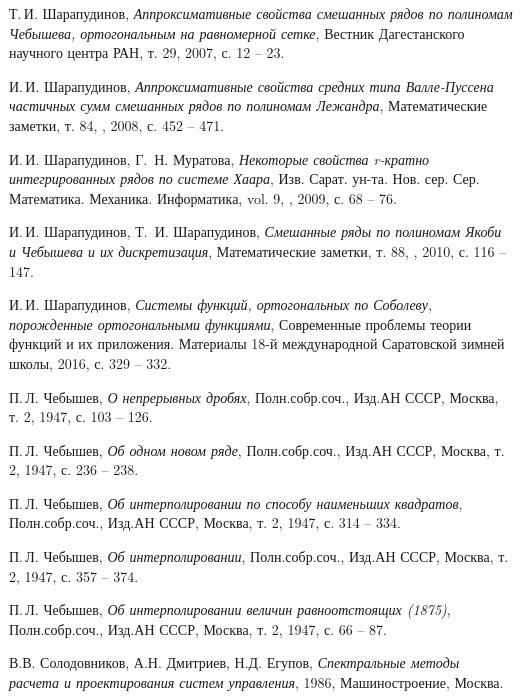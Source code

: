 Т.\,И. Шарапудинов,
\textit{Аппроксимативные свойства смешанных рядов по полиномам Чебышева, ортогональным на равномерной сетке},
Вестник Дагестанского научного центра РАН, т. 29, 2007, с. 12 -- 23.


И.\,И. Шарапудинов,
\textit{Аппроксимативные свойства средних типа Валле-Пуссена частичных сумм смешанных рядов по полиномам Лежандра},
Математические заметки, т. 84, , 2008, с. 452 -- 471.

 И.\,И. Шарапудинов,  Г.\, Н. Муратова,
\textit{Некоторые свойства r-кратно интегрированных рядов по системе Хаара},
Изв. Сарат. ун-та. Нов. сер. Сер. Математика. Механика. Информатика, vol. 9, , 2009, с. 68 -- 76.

И.\,И. Шарапудинов, Т.\, И. Шарапудинов,
\textit{Смешанные ряды по полиномам Якоби и Чебышева и их дискретизация},
Математические заметки, т. 88, , 2010, с. 116 -- 147.


И.\,И. Шарапудинов,
\textit{Системы функций, ортогональных по Соболеву, порожденные ортогональными функциями},
Современные проблемы теории функций и их приложения.  Материалы 18-й международной Саратовской зимней школы,
2016, с. 329 -- 332.

П.\,Л. Чебышев,
\textit{О непрерывных дробях}, Полн.собр.соч., Изд.АН СССР, Москва, т. 2, 1947, с. 103 -- 126.

П.\,Л. Чебышев,
\textit{Об одном новом ряде}, Полн.собр.соч., Изд.АН СССР, Москва, т. 2, 1947, с. 236 -- 238.

П.\,Л. Чебышев,
\textit{Об интерполировании по способу наименьших квадратов},
Полн.собр.соч., Изд.АН СССР, Москва, т. 2, 1947, с. 314 -- 334.

П.\,Л. Чебышев,
\textit{Об интерполировании}, Полн.собр.соч., Изд.АН СССР, Москва, т. 2, 1947, с. 357 -- 374.

П.\,Л. Чебышев,
\textit{Об интерполировании величин  равноотстоящих (1875)},
Полн.собр.соч., Изд.АН СССР, Москва, т. 2, 1947, с. 66 -- 87.

В.В. Солодовников, А.Н. Дмитриев, Н.Д. Егупов,
\textit{Спектральные методы расчета и проектирования систем управления}, 1986, Машиностроение, Москва.


